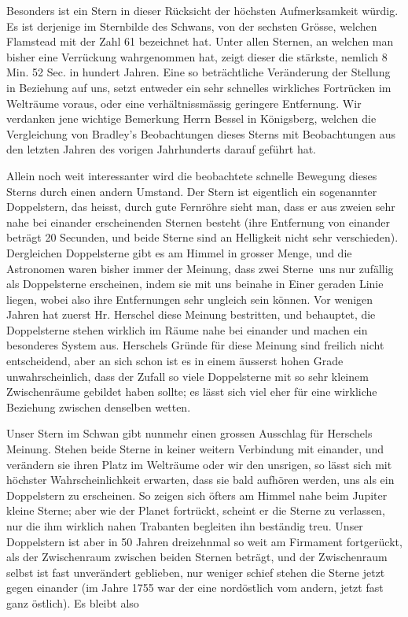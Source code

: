 \documentclass[10pt,a4paper]{article}
\begin{document}
Besonders ist ein Stern in dieser Rücksicht der höchsten Aufmerksamkeit würdig. Es ist derjenige im Sternbilde des Schwans, von der sechsten Grösse, welchen Flamstead mit der Zahl 61 bezeichnet hat. Unter allen Sternen, an welchen man bisher eine Verrückung wahrgenommen hat, zeigt dieser die stärkste, nemlich 8 Min. 52 Sec. in hundert Jahren. Eine so beträchtliche Veränderung der Stellung in Beziehung auf uns, setzt entweder ein sehr schnelles wirkliches Fortrücken im Welträume voraus, oder eine verhältnissmässig geringere Entfernung. Wir verdanken jene wichtige Bemerkung Herrn Bessel in Königsberg, welchen die Vergleichung von Bradley's Beobachtungen dieses Sterns mit Beobachtungen aus den letzten Jahren des vorigen Jahrhunderts darauf geführt hat.

Allein noch weit interessanter wird die beobachtete schnelle Bewegung dieses Sterns durch einen andern Umstand. Der Stern ist eigentlich ein sogenannter Doppelstern, das heisst, durch gute Fernröhre sieht man, dass er aus zweien sehr nahe bei einander erscheinenden Sternen besteht (ihre Entfernung von einander beträgt 20 Secunden, und beide Sterne sind an Helligkeit nicht sehr verschieden). Dergleichen Doppelsterne gibt es am Himmel in grosser Menge, und die Astronomen waren bisher immer der Meinung, dass zwei Sterne\ uns nur zufällig als Doppelsterne erscheinen, indem sie mit uns beinahe in Einer geraden Linie liegen, wobei also ihre Entfernungen sehr ungleich sein können. Vor wenigen Jahren hat zuerst Hr. Herschel diese Meinung bestritten, und behauptet, die Doppelsterne stehen wirklich im Räume nahe bei einander und machen ein besonderes System aus. Herschels Gründe für diese Meinung sind freilich nicht entscheidend, aber an sich schon ist es in einem äusserst hohen Grade unwahrscheinlich, dass der Zufall so viele Doppelsterne mit so sehr kleinem Zwischenräume gebildet haben sollte; es lässt sich viel eher für eine wirkliche Beziehung zwischen denselben wetten.

Unser Stern im Schwan gibt nunmehr einen grossen Ausschlag für Herschels Meinung. Stehen beide Sterne in keiner weitern Verbindung mit einander, und verändern sie ihren Platz im Welträume oder wir den unsrigen, so lässt sich mit höchster Wahrscheinlichkeit erwarten, dass sie bald aufhören werden, uns als ein Doppelstern zu erscheinen. So zeigen sich öfters am Himmel nahe beim Jupiter kleine Sterne; aber wie der Planet fortrückt, scheint er die Sterne zu verlassen, nur die ihm wirklich nahen Trabanten begleiten ihn beständig treu. Unser Doppelstern ist aber in 50 Jahren dreizehnmal so weit am Firmament fortgerückt, als der Zwischenraum zwischen beiden Sternen beträgt, und der Zwischenraum selbst ist fast unverändert geblieben, nur weniger schief stehen die Sterne jetzt gegen einander (im Jahre 1755 war der eine nordöstlich vom andern, jetzt fast ganz östlich). Es bleibt also
\end{document}
